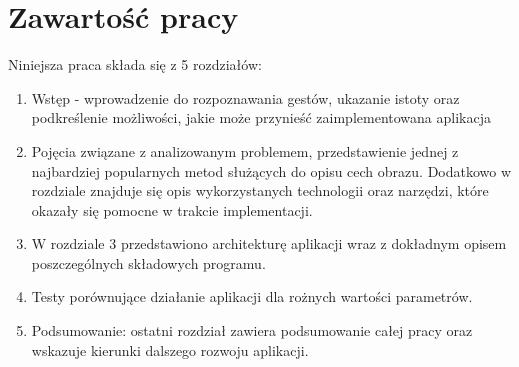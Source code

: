 \section{Zawartość pracy}
\label{sec:zawartoscPracy}
Niniejsza praca składa się z 5 rozdziałów:
\begin{enumerate}
	\item Wstęp - wprowadzenie do rozpoznawania gestów, ukazanie istoty oraz podkreślenie możliwości, jakie może przynieść zaimplementowana aplikacja
	\item Pojęcia związane z analizowanym problemem, przedstawienie jednej z najbardziej popularnych metod służących do opisu cech obrazu. Dodatkowo w rozdziale znajduje się opis wykorzystanych technologii oraz narzędzi, które okazały się pomocne w trakcie implementacji.
	\item W rozdziale 3 przedstawiono architekturę aplikacji wraz z dokładnym opisem poszczególnych składowych programu.
	\item Testy porównujące działanie aplikacji dla rożnych wartości parametrów.
	\item Podsumowanie: ostatni rozdział zawiera podsumowanie całej pracy oraz wskazuje kierunki dalszego rozwoju aplikacji. 
\end{enumerate}


















